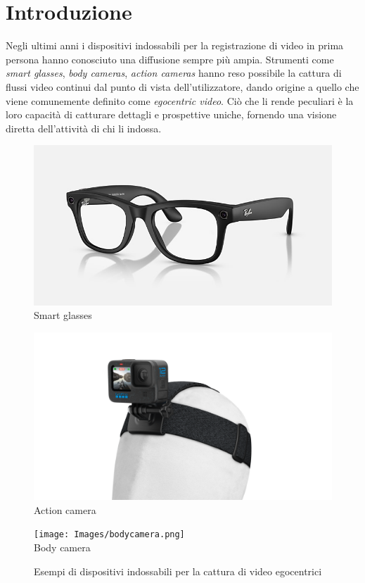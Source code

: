 \chapter{Introduzione}

Negli ultimi anni i dispositivi indossabili per la registrazione di video in prima persona hanno conosciuto una diffusione sempre più ampia. Strumenti come \emph{smart glasses}, \emph{body cameras}, \emph{action cameras} hanno reso possibile la cattura di flussi video continui dal punto di vista dell'utilizzatore, dando origine a quello che viene comunemente definito come \emph{egocentric video}. Ciò che li rende peculiari è la loro capacità di catturare dettagli e prospettive uniche, fornendo una visione diretta dell'attività di chi li indossa.

\begin{figure}[ht]
    \centering
    \begin{minipage}{0.3\linewidth}
        \centering
        \includegraphics[width=\linewidth]{Images/meta_glass.png}\\
        Smart glasses
    \end{minipage}
    \hfill
    \begin{minipage}{0.3\linewidth}
        \centering
        \includegraphics[width=\linewidth]{Images/gopro.png}\\
        Action camera
    \end{minipage}
    \hfill
    \begin{minipage}{0.3\linewidth}
        \centering
        \texttt{[image: Images/bodycamera.png]}\\
        Body camera
    \end{minipage}
    \caption{Esempi di dispositivi indossabili per la cattura di video egocentrici}
    \label{fig:dispositivi_egocentrici}
\end{figure}

